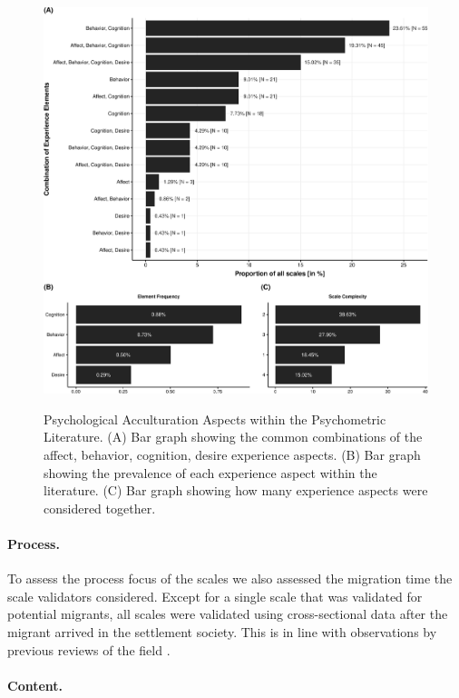 \begin{figure}[h]
\centering
\caption{Psychological Acculturation Aspects within the Psychometric Literature. (A) Bar graph showing the common combinations of the affect, behavior, cognition, desire experience aspects. (B) Bar graph showing the prevalence of each experience aspect within the literature. (C) Bar graph showing how many experience aspects were considered together.}
\includegraphics[width=\textwidth]{Figures/ABCDFreq-1}
\label{fig:ElementsScales}
\end{figure}

\paragraph{Process.}

To assess the process focus of the scales we also assessed the migration
time the scale validators considered. Except for a single scale that was
validated for potential migrants, all scales were validated using
cross-sectional data after the migrant arrived in the settlement
society. This is in line with observations by previous reviews of the
field \citep[e.g.,][]{Brown2011}.

\color{blue}
\paragraph{Content.}

